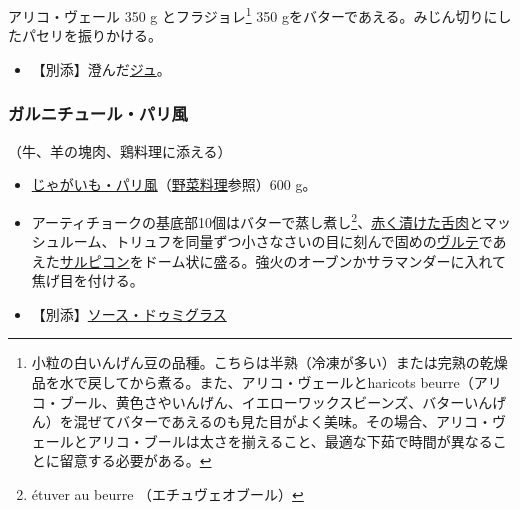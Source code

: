 \begin{recette}


アリコ・ヴェール 350 g とフラジョレ\footnote{小粒の白いんげん豆の品種。こちらは半熟（冷凍が多い）または完熟の乾燥品を水で戻してから煮る。また、アリコ・ヴェールとharicots
  beurre（アリコ・ブール、黄色さやいんげん、イエローワックスビーンズ、バターいんげん）を混ぜてバターであえるのも見た目がよく美味。その場合、アリコ・ヴェールとアリコ・ブールは太さを揃えること、最適な下茹で時間が異なることに留意する必要がある。}
350 gをバターであえる。みじん切りにしたパセリを振りかける。

\begin{itemize}
\tightlist
\item
  【別添】澄んだ\protect\hyperlink{jus-de-veau-lie}{ジュ}。
\end{itemize}

\atoaki{}

\hypertarget{garniture-a-la-parisienne}{%
\subsubsection{ガルニチュール・パリ風}\label{garniture-a-la-parisienne}}



（牛、羊の塊肉、鶏料理に添える）

\begin{itemize}
\item
  \protect\hyperlink{pommes-de-terre-a-la-parisienne}{じゃがいも・パリ風}（\protect\hyperlink{legumes}{野菜料理}参照）600
  g。
\item
  アーティチョークの基底部10個はバターで蒸し煮し\footnote{étuver au
    beurre （エチュヴェオブール）}、\protect\hyperlink{saumure-liquide-pour-langues}{赤く漬けた舌肉}とマッシュルーム、トリュフを同量ずつ小さなさいの目に刻んで固めの\protect\hyperlink{veloute}{ヴルテ}であえた\protect\hyperlink{salpicons-divers}{サルピコン}をドーム状に盛る。強火のオーブンかサラマンダーに入れて焦げ目を付ける。
\item
  【別添】\protect\hyperlink{sauce-demi-glace}{ソース・ドゥミグラス}
\end{itemize}


\end{recette}
